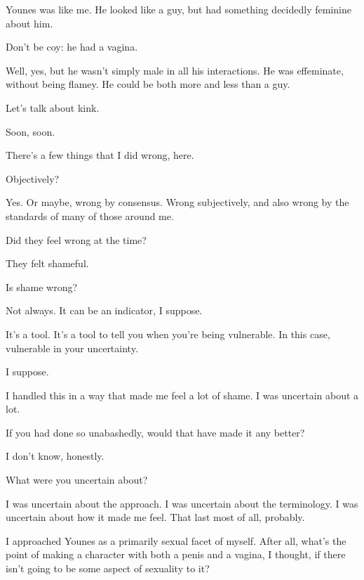 \begin{paracol}{2}
\begin{leftcolumn}
Younes was like me. He looked like a guy, but had something decidedly feminine about him.

\begin{ally}
Don't be coy: he had a vagina.
\end{ally}
Well, yes, but he wasn't simply male in all his interactions. He was effeminate, without being flamey. He could be both more and less than a guy.

\begin{ally}
Let's talk about kink.
\end{ally}
Soon, soon.
\newpage

\noindent There's a few things that I did wrong, here.

\begin{ally}
Objectively?
\end{ally}
Yes. Or maybe, wrong by consensus. Wrong subjectively, and also wrong by the standards of many of those around me.

\begin{ally}
Did they feel wrong at the time?
\end{ally}
They felt shameful.

\begin{ally}
Is shame wrong?
\end{ally}
Not always. It can be an indicator, I suppose.

\begin{ally}
It's a tool. It's a tool to tell you when you're being vulnerable. In this case, vulnerable in your uncertainty.
\end{ally}
I suppose.

I handled this in a way that made me feel a lot of shame. I was uncertain about a lot.

\begin{ally}
If you had done so unabashedly, would that have made it any better?
\end{ally}
I don't know, honestly.

\begin{ally}
What were you uncertain about?
\end{ally}
I was uncertain about the approach. I was uncertain about the terminology. I was uncertain about how it made me feel. That last most of all, probably.

I approached Younes as a primarily sexual facet of myself. After all, what's the point of making a character with both a penis and a vagina, I thought, if there isn't going to be some aspect of sexuality to it?


\end{leftcolumn}
\end{paracol}
